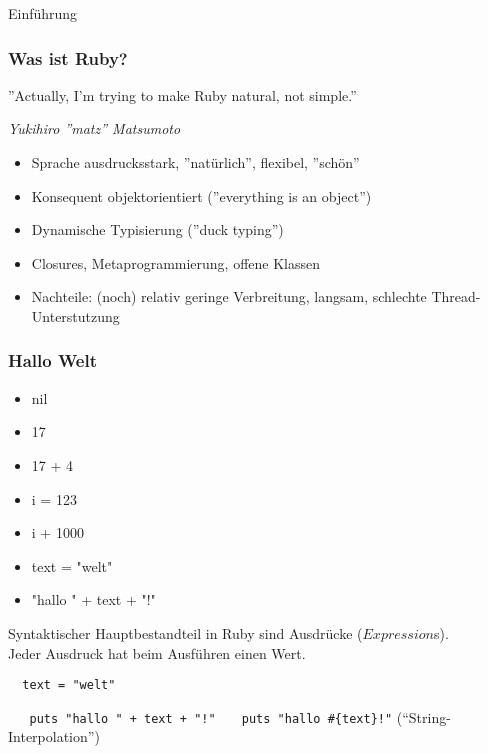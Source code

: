 \documentclass{beamer}
\begin{document}
\lstset{language=Ruby}
\lstset{basicstyle=\small,numbers=none, numberstyle=\tiny, numbersep=5pt}


\begin{frame}
\titlepage
\end{frame}

\begin{frame}{Einführung}
\frametitle{Was ist Ruby?}

\begin{center}
''Actually, I'm trying to make Ruby natural, not simple.'' 
\end{center}
\begin{flushright}
\emph{Yukihiro ''matz'' Matsumoto}
\end{flushright}



\begin{itemize}
\pause \item Sprache ausdrucksstark\pause, ''natürlich''\pause, flexibel\pause, ''schön''
\pause \item Konsequent objektorientiert (''everything is an object'')
\pause \item Dynamische Typisierung (''duck typing'')
\pause \item Closures, Metaprogrammierung, offene Klassen
\pause \item Nachteile: (noch) relativ geringe Verbreitung\pause,  langsam\pause, 
              schlechte Thread-Unterstutzung
\end{itemize}
\end{frame}

\begin{frame}[fragile]
  \frametitle{Hallo Welt}
  \begin{itemize}[<+->]
  \item nil
  \item 17
  \item 17 + 4
  \item i = 123
  \item i + 1000
  \item text = "welt"
  \item "hallo " + text + "!"
  \end{itemize}
  \pause
  Syntaktischer Hauptbestandteil in Ruby sind Ausdrücke ($Expression$s).\\
  Jeder Ausdruck hat beim Ausführen einen Wert.\\
  \pause
  \begin{lstlisting}
  text = "welt"
  \end{lstlisting}
  \pause
  \lstinline|   puts "hallo " + text + "!"|
  \pause
  \lstinline|   puts "hallo #{text}!"| \hspace{5em}  (``String-Interpolation'')

\end{frame}
\end{document}
